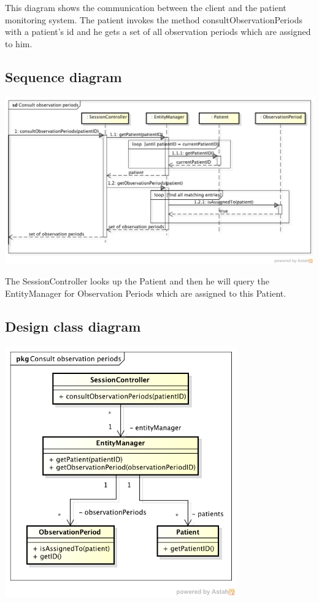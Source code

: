\documentclass[fontsize=12pt,
               paper=a4,
               twoside=false,
               parskip=half,
               ]{scrartcl}
\begin{document}
This diagram shows the communication between the client and the patient monitoring system. The patient invokes the method consultObservationPeriods with a patient's id and he gets a set of all observation periods which are assigned to him.

\subsection{Sequence diagram}

\includegraphics[width=15cm]{./img/sequence-diagrams/consult-observation-periods.png}

The SessionController looks up the Patient and then he will query the EntityManager for Observation Periods which are assigned to this Patient.

\subsection{Design class diagram}


\includegraphics[width=10cm]{./img/design-class-diagrams/consult-observation-periods.png}
\end{document}
